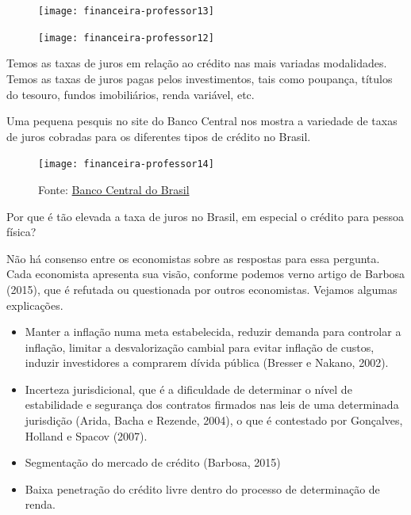 \begin{paginatexto}
\begin{figure}[H]
\centering

\texttt{[image: financeira-professor13]}
\end{figure}

\begin{figure}[H]
\centering

\texttt{[image: financeira-professor12]}
\end{figure}


Temos as taxas de juros em relação ao crédito nas mais variadas modalidades. Temos as taxas de juros pagas pelos investimentos, tais como poupança, títulos do tesouro, fundos imobiliários, renda variável, etc.

Uma pequena pesquis  no site do Banco Central nos mostra a variedade de taxas de juros cobradas para os diferentes tipos de crédito no Brasil.

\begin{figure}[H]
\centering

\texttt{[image: financeira-professor14]}

\caption{Fonte: \href{https://www.bcb.gov.br/estatisticas/txjuros}{Banco Central do Brasil}}
\end{figure}

Por que é tão elevada a taxa de juros no Brasil, em especial o crédito para pessoa física?

Não há consenso entre os economistas sobre as respostas para essa pergunta. Cada economista apresenta sua visão, conforme podemos verno artigo de Barbosa (2015), que é refutada ou questionada por outros economistas. Vejamos algumas explicações.

\begin{itemize}
  \item Manter a inflação numa meta estabelecida, reduzir demanda para controlar a inflação, limitar a desvalorização cambial para evitar inflação de custos, induzir investidores a comprarem dívida pública (Bresser e Nakano, 2002).

  \item Incerteza jurisdicional, que é a dificuldade de determinar o nível de estabilidade e segurança dos contratos firmados nas leis de uma determinada jurisdição (Arida, Bacha e Rezende, 2004), o que é contestado por Gonçalves, Holland e Spacov (2007).

  \item Segmentação do mercado de crédito (Barbosa, 2015)

  \item Baixa penetração do crédito livre dentro do processo de determinação de renda.


\end{itemize}
\end{paginatexto}
